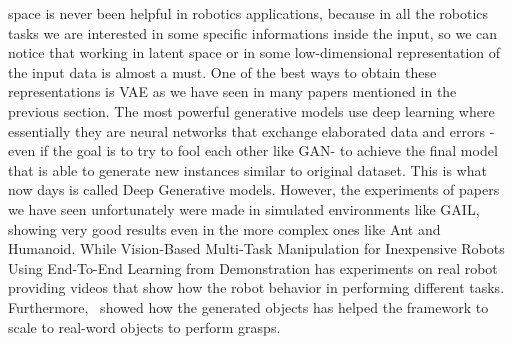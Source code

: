 space is never been helpful in robotics applications, because in all the robotics tasks we are interested in some specific informations inside the input, so we can notice that working in latent space or in some low-dimensional representation of the input data is almost a must. One of the best ways to obtain these representations is VAE as we have seen in many papers mentioned in the previous section. The most powerful generative models use deep learning where essentially they are neural networks that exchange elaborated data and errors -even if the goal is to try to fool each other like GAN- to achieve the final model that is able to generate new instances similar to original dataset. This is what now days is called Deep Generative models. However, the experiments of papers we have seen unfortunately were made in simulated environments like GAIL, showing very good results even in the more complex ones like Ant and Humanoid. While Vision-Based Multi-Task Manipulation for Inexpensive Robots Using End-To-End Learning from Demonstration has experiments on real robot providing videos that show how the robot behavior in performing different tasks. Furthermore,~\cite{tobin2018domain} showed how the generated objects has helped the framework to scale to real-word objects to perform grasps.

\clearpage{\pagestyle{empty}\cleardoublepage}